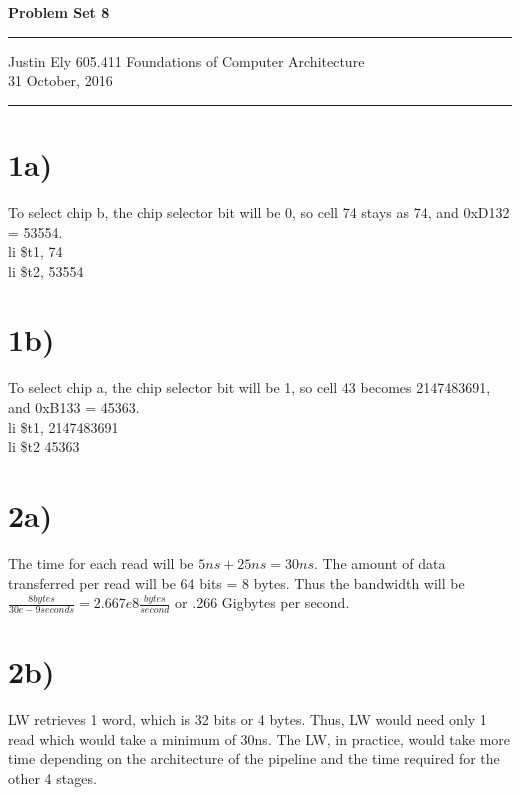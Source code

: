 \documentclass[a4paper,11pt]{article}
\begin{document}
\begin{flushright}

\vspace{1.1cm}

{\bf\Huge Problem Set 8}

\rule{0.25\linewidth}{0.5pt}

\vspace{0.5cm}
Justin Ely
\linebreak
\newline
\footnotesize{605.411 Foundations of Computer Architecture \\}
\vspace{0.5cm}
31 October, 2016
\end{flushright}

\noindent\rule{\linewidth}{1.0pt}


\section*{1a)}
To select chip b, the chip selector bit will be 0, so cell 74 stays
as 74, and 0xD132 = 53554. \\

\noindent li \$t1, 74 \\
\noindent li \$t2, 53554


\section*{1b)}
To select chip a, the chip selector bit will be 1, so cell 43 becomes 
2147483691, and 0xB133 = 45363. \\

\noindent li \$t1, 2147483691 \\
\noindent li \$t2 45363


\section*{2a)} 
The time for each read will be $5ns + 25ns = 30ns$.  The amount
of data transferred per read will be 64 bits = 8 bytes.  Thus the 
bandwidth will be $\frac{8 bytes}{30e-9 seconds} = 2.667e8 \frac{bytes}{second}$ or .266 Gigbytes per second.


\section*{2b)}
LW retrieves 1 word, which is 32 bits or 4 bytes.  Thus, LW would need only
1 read which would take a minimum of 30ns.  The LW, in practice, would take more 
time depending on the architecture of the pipeline and the time required
for the other 4 stages. 
\end{document}

